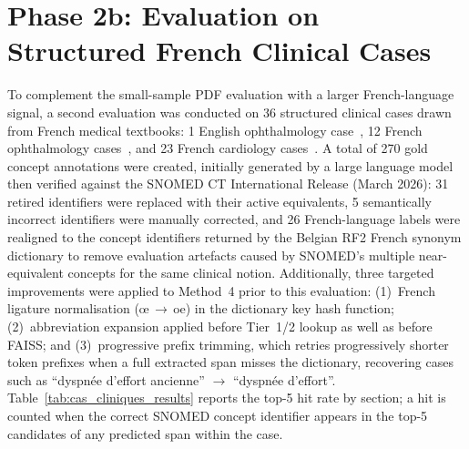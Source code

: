 \section{Phase 2b: Evaluation on Structured French Clinical Cases}

To complement the small-sample PDF evaluation with a larger French-language signal, a second evaluation was conducted on 36 structured clinical cases drawn from French medical textbooks: 1 English ophthalmology case~\cite{Friedman:2022}, 12 French ophthalmology cases~\cite{COUF:2013}, and 23 French cardiology cases~\cite{CNEC:2015}. A total of 270 gold concept annotations were created, initially generated by a large language model then verified against the SNOMED CT International Release (March 2026): 31 retired identifiers were replaced with their active equivalents, 5 semantically incorrect identifiers were manually corrected, and 26 French-language labels were realigned to the concept identifiers returned by the Belgian RF2 French synonym dictionary to remove evaluation artefacts caused by SNOMED's multiple near-equivalent concepts for the same clinical notion. Additionally, three targeted improvements were applied to Method~4 prior to this evaluation: (1)~French ligature normalisation (œ\,$\rightarrow$\,oe) in the dictionary key hash function; (2)~abbreviation expansion applied before Tier~1/2 lookup as well as before FAISS; and (3)~progressive prefix trimming, which retries progressively shorter token prefixes when a full extracted span misses the dictionary, recovering cases such as ``dyspnée d'effort ancienne'' $\rightarrow$ ``dyspnée d'effort''. Table~\ref{tab:cas_cliniques_results} reports the top-5 hit rate by section; a hit is counted when the correct SNOMED concept identifier appears in the top-5 candidates of any predicted span within the case.

\begin{table}[htbp]
\centering
\scriptsize
\caption{Top-5 hit rate on \texttt{cas\_cliniques} (36 cases, 270 gold annotations). M1--M4: top-5 candidates across all spans; Claude~S. and GPT-3.5: exact SNOMED concept match (same prompt, no retrieval index). M4 and M4$_{\text{rerank}}$ score identically on top-5 hit rate: reranking reorders candidates within the top-5 (improving Hits@1 and MRR) but does not change top-5 presence.}
\label{tab:cas_cliniques_results}
\end{table}

